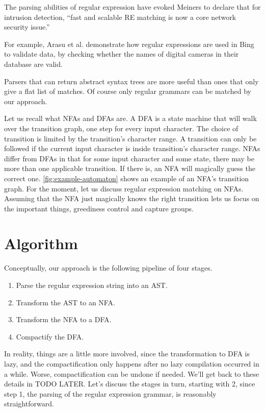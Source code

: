 \documentclass[english]{sigplanconf}
\theoremstyle{definition}
\newcommand{\ins}[1]{\textcolor{blue}{\uline{#1}}} %
\newcommand{\ins}[1]{#1} %
\renewcommand{\ins}[1]{#1} %
\begin{document}
The parsing abilities of regular expression have evoked Meiners to declare
that for intrusion detection, ``fast and scalable RE matching is
now a core network security issue.'' \cite{Mein10a}

For example, Arasu et al. \cite{Aras12a} demonstrate how regular
expressions are used in Bing to validate data, by checking whether
the names of digital cameras in their database are valid.

Parsers that can return abstract syntax trees are more useful than
ones that only give a flat list of matches. Of course only regular
grammars can be matched by our approach.

Let us recall what NFAs and DFAs are. A DFA is a state machine that
will walk over the transition graph, one step for every input
character. The choice of transition is limited by the transition's
character range. A transition can only be followed if the current
input character is inside transition's character range. NFAs differ
from DFAs in that for some input character and some state, there may
be more than \ins{one} applicable transition. If there is, an NFA will magically
guess the correct one. \autoref{fig:example-automaton} shows an example of
an NFA's transition graph. For the moment, let us discuss regular
expression matching on NFAs. Assuming that the NFA just magically knows
the right transition lets us focus on the important things, greediness control
and capture groups.

\section{Algorithm}

Conceptually, our approach is the following pipeline of four stages.
\begin{enumerate}
  \item Parse the regular expression string into an AST.
  \item Transform the AST to an NFA.
  \item Transform the NFA to a DFA.
  \item Compactify the DFA.
\end{enumerate}

In reality, things are a little more involved, since the transformation
to DFA is lazy, and the compactification only happens after no lazy
compilation occurred in a while. Worse, compactification can be
undone if needed. We'll get back to these details in TODO LATER.
Let's discuss the stages in turn, starting with 2, since step 1,
the parsing of the regular expression grammar, is reasonably
straightforward.
\end{document}

